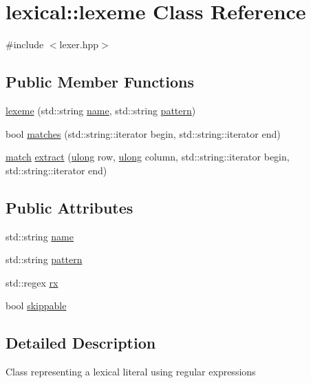 \hypertarget{classlexical_1_1lexeme}{}\section{lexical\+:\+:lexeme Class Reference}
\label{classlexical_1_1lexeme}


{\ttfamily \#include $<$lexer.\+hpp$>$}

\subsection*{Public Member Functions}
\begin{DoxyCompactItemize}
\item 
\hyperlink{classlexical_1_1lexeme_a2a69e7860946ccb70ab8f8ca0970ca42}{lexeme} (std\+::string \hyperlink{classlexical_1_1lexeme_a43f46025bbc59bdaff06d4e4efc979c1}{name}, std\+::string \hyperlink{classlexical_1_1lexeme_a8265b6f1e87790a3ca3fcd82b5543726}{pattern})
\item 
bool \hyperlink{classlexical_1_1lexeme_a26fd45099f7e056db7f39cd9f222cf97}{matches} (std\+::string\+::iterator begin, std\+::string\+::iterator end)
\item 
\hyperlink{structlexical_1_1match}{match} \hyperlink{classlexical_1_1lexeme_ade092b47d889c338daa38902409747ab}{extract} (\hyperlink{types_8h_ab2bb0e5480d1d957383df6b350794313}{ulong} row, \hyperlink{types_8h_ab2bb0e5480d1d957383df6b350794313}{ulong} column, std\+::string\+::iterator begin, std\+::string\+::iterator end)
\end{DoxyCompactItemize}
\subsection*{Public Attributes}
\begin{DoxyCompactItemize}
\item 
std\+::string \hyperlink{classlexical_1_1lexeme_a43f46025bbc59bdaff06d4e4efc979c1}{name}
\item 
std\+::string \hyperlink{classlexical_1_1lexeme_a8265b6f1e87790a3ca3fcd82b5543726}{pattern}
\item 
std\+::regex \hyperlink{classlexical_1_1lexeme_a2185fc486b1c6c75a57a3e30155eed15}{rx}
\item 
bool \hyperlink{classlexical_1_1lexeme_accc3564ad951f163e3cf4dd8f93ede15}{skippable}
\end{DoxyCompactItemize}


\subsection{Detailed Description}
Class representing a lexical literal using regular expressions 

